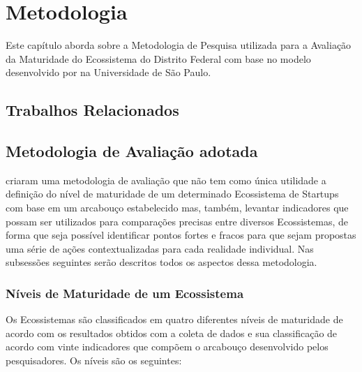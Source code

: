 \chapter[Metodologia]{Metodologia}
\label{cap-metodologia}

Este capítulo aborda sobre a Metodologia de Pesquisa utilizada para a Avaliação da Maturidade do Ecossistema do Distrito Federal com base no modelo desenvolvido por  na Universidade de São Paulo.

\section{Trabalhos Relacionados}
\label{section:trabalhos_relacionados}

\section{Metodologia de Avaliação adotada}
\label{section:metodologia_de_avaliacao_adotada}

 criaram uma metodologia de avaliação que não tem como única utilidade a definição do nível de maturidade de um determinado Ecossistema de Startups com base em um arcabouço estabelecido mas, também, levantar indicadores que possam ser utilizados para comparações precisas entre diversos Ecossistemas, de forma que seja possível identificar pontos fortes e fracos para que sejam propostas uma série de ações contextualizadas para cada realidade individual. Nas subsessões seguintes serão descritos todos os aspectos dessa metodologia.

\subsection{Níveis de Maturidade de um Ecossistema}
\label{subsection:niveis_de_maturidade_de_um_ecossistema}

Os Ecossistemas são classificados em quatro diferentes níveis de maturidade de acordo com os resultados obtidos com a coleta de dados e sua classificação de acordo com vinte indicadores que compõem o arcabouço desenvolvido pelos pesquisadores. Os níveis são os seguintes:

